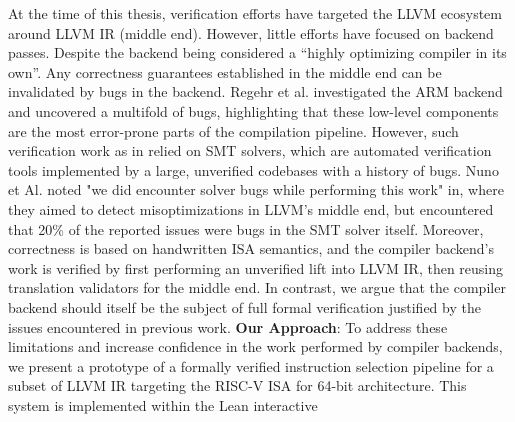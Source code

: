 \documentclass[review, anonymous, acmsmall, screen]{acmart}
\begin{document}
At the time of this thesis, verification efforts have targeted the LLVM ecosystem around LLVM IR 
(middle end). However, little efforts have focused on backend passes. Despite the backend being considered a “highly
optimizing compiler in its own”. Any correctness guarantees established in the middle
end can be invalidated by bugs in the backend. Regehr et al. investigated the ARM 
backend and uncovered a multifold of bugs, highlighting that these low-level components are the most
error-prone parts of the compilation pipeline. However, such  verification work as in
relied on SMT solvers, which are automated verification tools implemented by a large, unverified 
codebases with a history of bugs. Nuno et Al. noted "we did encounter solver bugs while performing 
this work" in, where they aimed to detect misoptimizations in LLVM’s middle end, but encountered that
20\% of the reported issues were bugs in the SMT solver itself. Moreover, correctness is based on 
handwritten ISA semantics, and the compiler backend's work is verified by first performing an unverified
lift into LLVM IR, then reusing translation validators for the middle end. In contrast, we argue that the
compiler backend should itself be the subject of full formal verification justified by the issues 
encountered in previous work.\newline
\textbf{Our Approach}:
To address these limitations and increase confidence in the work performed by compiler backends, we 
present a prototype of a formally verified instruction selection pipeline for a subset of LLVM IR 
targeting the RISC-V ISA for 64-bit architecture. This system is implemented within the Lean interactive
\end{document}
